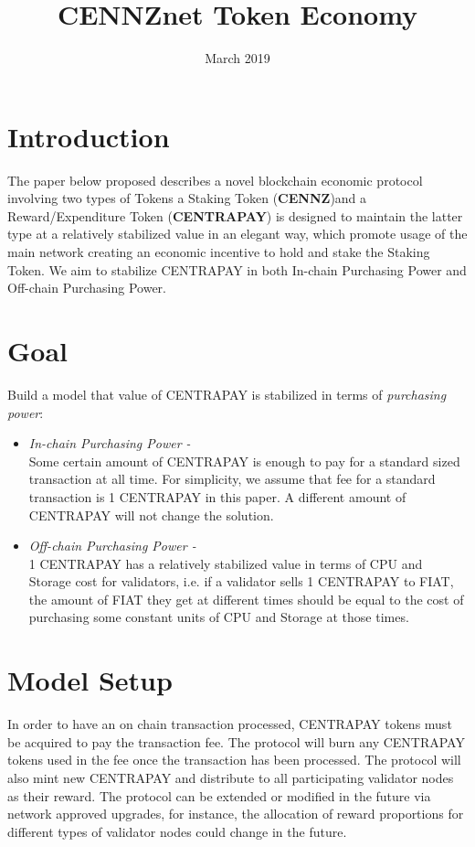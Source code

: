 \documentclass{article}
\title{CENNZnet Token Economy}
\author{}
\date{March 2019}
\begin{document}
\maketitle

\section{Introduction} The paper below proposed describes a novel blockchain economic protocol involving two types of Tokens a Staking Token (\textbf{CENNZ})and a Reward/Expenditure Token (\textbf{CENTRAPAY}) is designed to maintain the latter type at a relatively stabilized value in an elegant way, which promote usage of the main network creating an economic incentive to hold and stake the Staking Token. We aim to stabilize CENTRAPAY in both In-chain Purchasing Power and Off-chain Purchasing Power.

\section{Goal}
Build a model that value of CENTRAPAY is stabilized in terms of \textit{purchasing power}: 

\begin{itemize}
  \item \textit{In-chain Purchasing Power -} \\
  Some certain amount of CENTRAPAY is enough to pay for a standard sized transaction at all time. For simplicity, we assume that fee for a standard transaction is 1 CENTRAPAY in this paper. A different amount of CENTRAPAY will not change the solution.
  \item \textit{Off-chain Purchasing Power - }\\
  1 CENTRAPAY has a relatively stabilized value in terms of CPU and Storage cost for validators, i.e. if a validator sells 1 CENTRAPAY to FIAT, the amount of FIAT they get at different times should be equal to the cost of purchasing some constant units of CPU and Storage at those times. 
\end{itemize}


\section{Model Setup}
In order to have an on chain transaction processed, CENTRAPAY tokens must be acquired to pay the transaction fee. The protocol will burn any CENTRAPAY tokens used in the fee  once the transaction has been processed. The protocol will also mint new CENTRAPAY and distribute to all participating validator nodes as their reward. The protocol can be extended or modified in the future via network approved upgrades, for instance, the allocation of reward proportions for different types of validator nodes could change in the future. 
\end{document}

